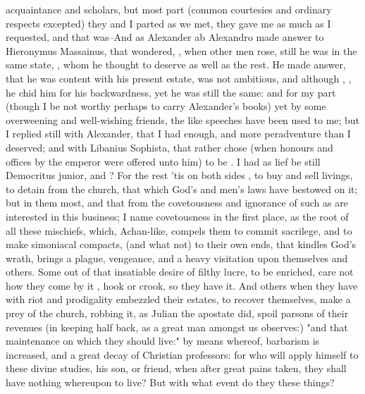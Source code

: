 acquaintance and scholars, but most part (common courtesies and ordinary
respects excepted) they and I parted as we met, they gave me as much as I
requested, and that was--And as Alexander ab Alexandro
 made answer to Hieronymus
Massainus, that wondered, , when other men rose, still he was in the
same state, , whom he thought to deserve as well as the rest. He made
answer, that he was content with his present estate, was not ambitious, and
although , \etc{}, he chid him for his
backwardness, yet he was still the same: and for my part (though I be not
worthy perhaps to carry Alexander's books) yet by some overweening and
well-wishing friends, the like speeches have been used to me; but I replied
still with Alexander, that I had enough, and more peradventure than I deserved;
and with Libanius Sophista, that rather chose (when honours and offices by the
emperor were offered unto him) to be . I had as lief be still Democritus junior, and ? For the rest 'tis on both sides , to buy and sell livings, to detain from the church, that which
God's and men's laws have bestowed on it; but in them most, and that from the
covetousness and ignorance of such as are interested in this business; I name
covetousness in the first place, as the root of all these mischiefs, which,
Achan-like, compels them to commit sacrilege, and to make simoniacal compacts,
(and what not) to their own ends, that kindles God's
wrath, brings a plague, vengeance, and a heavy visitation upon themselves and
others. Some out of that insatiable desire of filthy lucre, to be enriched,
care not how they come by it , hook or crook, so they have
it. And others when they have with riot and prodigality embezzled their
estates, to recover themselves, make a prey of the church, robbing it, as
Julian the apostate did, spoil parsons of their revenues
(in keeping half back, as a great man amongst us
observes:) "and that maintenance on which they should live:" by means whereof,
barbarism is increased, and a great decay of Christian professors: for who will
apply himself to these divine studies, his son, or friend, when after great
pains taken, they shall have nothing whereupon to live? But with what event do
they these things?

